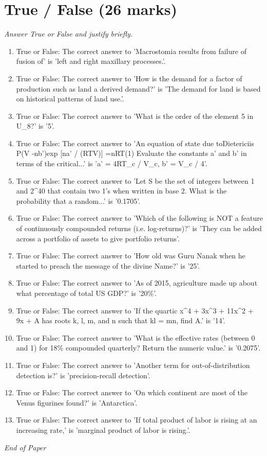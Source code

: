 \documentclass[12pt]{article}
\begin{document}
\section*{True / False (26 marks)}
\textit{Answer True or False and justify briefly.}
\begin{enumerate}[label=\arabic*.]
\item True or False: The correct answer to 'Macrostomia results from failure of fusion of' is 'left and right maxillary processes.'.
\item True or False: The correct answer to 'How is the demand for a factor of production such as land a derived demand?' is 'The demand for land is based on historical patterns of land use.'.
\item True or False: The correct answer to 'What is the order of the element 5 in U\_8?' is '5'.
\item True or False: The correct answer to 'An equation of state due toDietericiis P(V -nb')exp [na' / (RTV)] =nRT(1) Evaluate the constants a' and b' in terms of the critical...' is 'a' = 4RT\_c / V\_c, b' = V\_c / 4'.
\item True or False: The correct answer to 'Let S be the set of integers between 1 and 2\^{}40 that contain two 1's when written in base 2. What is the probability that a random...' is '0.1705'.
\item True or False: The correct answer to 'Which of the following is NOT a feature of continuously compounded returns (i.e. log-returns)?' is 'They can be added across a portfolio of assets to give portfolio returns'.
\item True or False: The correct answer to 'How old was Guru Nanak when he started to preach the message of the divine Name?' is '25'.
\item True or False: The correct answer to 'As of 2015, agriculture made up about what percentage of total US GDP?' is '20\%'.
\item True or False: The correct answer to 'If the quartic x\^{}4 + 3x\^{}3 + 11x\^{}2 + 9x + A has roots k, l, m, and n such that kl = mn, find A.' is '14'.
\item True or False: The correct answer to 'What is the effective rates (between 0 and 1) for 18\% compounded quarterly? Return the numeric value.' is '0.2075'.
\item True or False: The correct answer to 'Another term for out-of-distribution detection is?' is 'precision-recall detection'.
\item True or False: The correct answer to 'On which continent are most of the Venus figurines found?' is 'Antarctica'.
\item True or False: The correct answer to 'If total product of labor is rising at an increasing rate,' is 'marginal product of labor is rising.'.
\end{enumerate}

\vfill
\noindent\textit{End of Paper}
\end{document}
